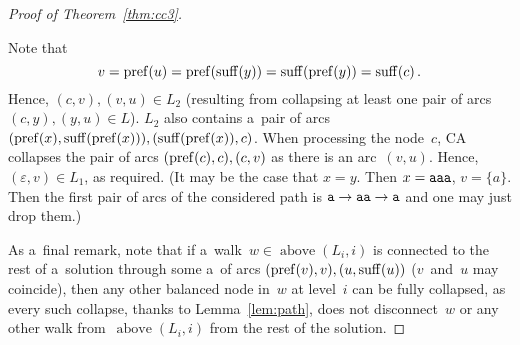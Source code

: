 \begin{proof}[Proof of Theorem~\ref{thm:cc3}]
\begin{description}
Note that 
\[v = \operatorname{pref}(u)=\operatorname{pref}(\operatorname{suff}(y))=\operatorname{suff}(\operatorname{pref}(y))=\operatorname{suff}(c) \, .\]
Hence, $(c,v), (v,u) \in L_2$ (resulting from collapsing at least one pair of arcs $(c,y), (y,u) \in L$). $L_2$ also contains a~pair of arcs $(\operatorname{pref}(x), \operatorname{suff}(\operatorname{pref}(x))), (\operatorname{suff}(\operatorname{pref}(x)), c)$. When processing the node~$c$, CA collapses the pair of arcs $(\operatorname{pref}(c), c), (c, v)$ as there is an arc~$(v,u)$.
Hence, $(\varepsilon, v) \in L_1$, as required. (It may be the case that $x=y$. Then $x={\tt aaa}$, $v=\{a\}$. Then the first pair of arcs of the considered path is ${\tt a} \to {\tt aa} \to {\tt a}$ and one may just drop them.)
\end{description}

As a~final remark, note that if a~walk~$w \in \operatorname{above}(L_i,i)$ is connected to the rest of a~solution through some a~of arcs $(\operatorname{pref}(v), v), (u, \operatorname{suff}(u))$ ($v$~and~$u$ may coincide), then any other balanced node in~$w$ at level~$i$ can be fully collapsed, as every such collapse, thanks to Lemma~\ref{lem:path}, does not disconnect~$w$ or any other walk from~$\operatorname{above}(L_i,i)$ from the rest of the solution.
\end{proof}

